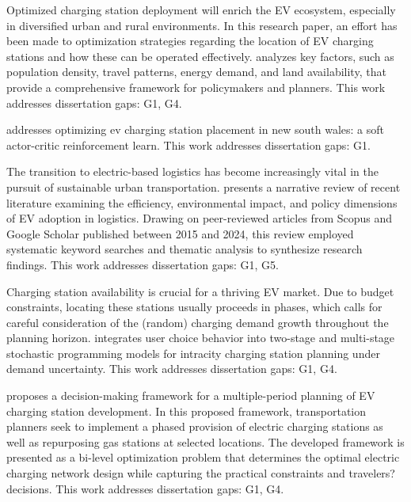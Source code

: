 \documentclass[letterpaper, 12pt, oneside, doublespacing]{Thesis}
\begin{document}
\noindent Optimized charging station deployment will enrich the EV ecosystem, especially in diversified urban and rural environments. In this research paper, an effort has been made to optimization strategies regarding the location of EV charging stations and how these can be operated effectively. \cite{optimization_strategies_2024} analyzes key factors, such as population density, travel patterns, energy demand, and land availability, that provide a comprehensive framework for policymakers and planners. This work addresses dissertation gaps: G1, G4.



\noindent \cite{optimizing_ev_2024} addresses optimizing ev charging station placement in new south wales: a soft actor-critic reinforcement learn. This work addresses dissertation gaps: G1.



\noindent The transition to electric-based logistics has become increasingly vital in the pursuit of sustainable urban transportation. \cite{optimizing_urban_2024} presents a narrative review of recent literature examining the efficiency, environmental impact, and policy dimensions of EV adoption in logistics. Drawing on peer-reviewed articles from Scopus and Google Scholar published between 2015 and 2024, this review employed systematic keyword searches and thematic analysis to synthesize research findings. This work addresses dissertation gaps: G1, G5.



\noindent Charging station availability is crucial for a thriving EV market. Due to budget constraints, locating these stations usually proceeds in phases, which calls for careful consideration of the (random) charging demand growth throughout the planning horizon. \cite{sequential_charging_2024} integrates user choice behavior into two-stage and multi-stage stochastic programming models for intracity charging station planning under demand uncertainty. This work addresses dissertation gaps: G1, G4.



\noindent \cite{sustainable_planning_2024} proposes a decision-making framework for a multiple-period planning of EV charging station development. In this proposed framework, transportation planners seek to implement a phased provision of electric charging stations as well as repurposing gas stations at selected locations. The developed framework is presented as a bi-level optimization problem that determines the optimal electric charging network design while capturing the practical constraints and travelers? decisions. This work addresses dissertation gaps: G1, G4.
\end{document}
